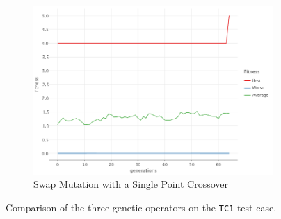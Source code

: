 \begin{figure}[ht!]
\begin{subfigure}{0.45\textwidth}
            \includegraphics[width=\textwidth]{img/beacon_sp_swap_1.png}
            \caption{Swap Mutation with a Single Point Crossover}
            \label{fig:beacon:1:swap}
        \end{subfigure}
        \caption{Comparison of the three genetic operators on the \texttt{TC1} test case.}
        \label{fig:beacon:1}
    \end{figure}
    
